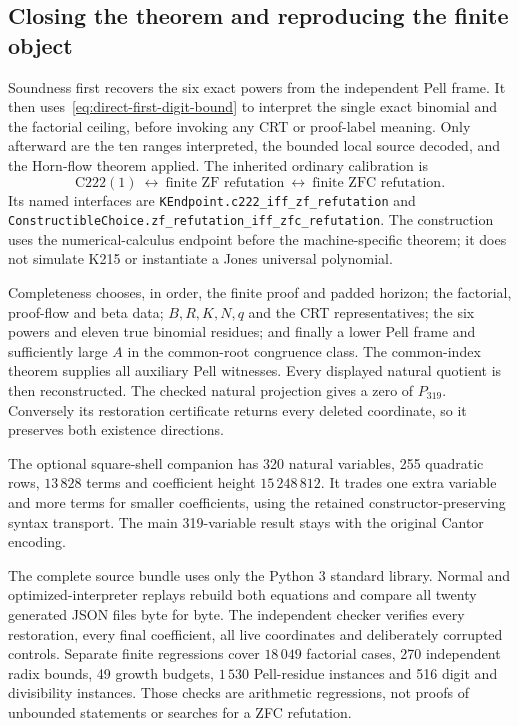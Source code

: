 \subsection{Closing the theorem and reproducing the finite object}

Soundness first recovers the six exact powers from the independent Pell
frame. It then uses~\eqref{eq:direct-first-digit-bound} to interpret the
single exact binomial and the factorial ceiling, before invoking any CRT
or proof-label meaning. Only afterward are the ten ranges interpreted,
the bounded local source decoded, and the Horn-flow theorem applied.
The inherited ordinary calibration is
\[
 \mathrm{C222}(1)\ \longleftrightarrow\
 \text{finite ZF refutation}\ \longleftrightarrow\
 \text{finite ZFC refutation}.
\]
Its named interfaces are
\texttt{KEndpoint.c222\_iff\_zf\_refutation} and
\texttt{ConstructibleChoice.zf\_refutation\_iff\_zfc\_refutation}.
The construction uses the numerical-calculus endpoint before the
machine-specific theorem; it does not simulate K215 or instantiate a
Jones universal polynomial.

Completeness chooses, in order, the finite proof and padded horizon;
the factorial, proof-flow and beta data; $B,R,K,N,q$ and the CRT
representatives; the six powers and eleven true binomial residues; and
finally a lower Pell frame and sufficiently large $A$ in the common-root
congruence class. The common-index theorem supplies all auxiliary Pell
witnesses. Every displayed natural quotient is then reconstructed.
The checked natural projection gives a zero of $P_{319}$. Conversely
its restoration certificate returns every deleted coordinate, so it
preserves both existence directions.

The optional square-shell companion has 320 natural variables, 255
quadratic rows, $13\,828$ terms and coefficient height $15\,248\,812$.
It trades one extra variable and more terms for smaller coefficients,
using the retained constructor-preserving syntax transport. The main
319-variable result stays with the original Cantor encoding.

The complete source bundle uses only the Python 3 standard library.
Normal and optimized-interpreter replays rebuild both equations and
compare all twenty generated JSON files byte for byte. The independent
checker verifies every restoration, every final coefficient, all live
coordinates and deliberately corrupted controls. Separate finite
regressions cover $18\,049$ factorial cases, 270 independent radix
bounds, 49 growth budgets, $1\,530$ Pell-residue instances and 516 digit
and divisibility instances. Those checks are arithmetic regressions,
not proofs of unbounded statements or searches for a ZFC refutation.
